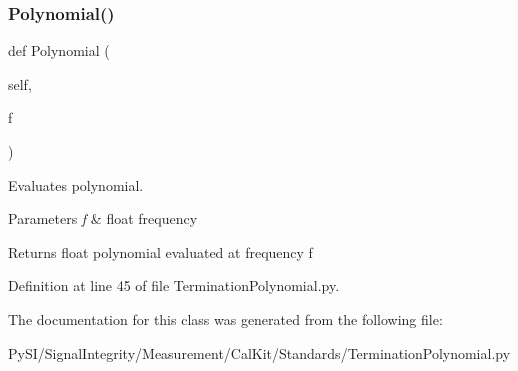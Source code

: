 \subsubsection{\texorpdfstring{Polynomial()}{Polynomial()}}
{\footnotesize\ttfamily def Polynomial (\begin{DoxyParamCaption}\item[{}]{self,  }\item[{}]{f }\end{DoxyParamCaption})}



Evaluates polynomial. 


\begin{DoxyParams}{Parameters}
{\em f} & float frequency \\
\hline
\end{DoxyParams}
\begin{DoxyReturn}{Returns}
float polynomial evaluated at frequency f 
\end{DoxyReturn}


Definition at line 45 of file Termination\+Polynomial.\+py.



The documentation for this class was generated from the following file\+:\begin{DoxyCompactItemize}
\item 
Py\+S\+I/\+Signal\+Integrity/\+Measurement/\+Cal\+Kit/\+Standards/Termination\+Polynomial.\+py\end{DoxyCompactItemize}
